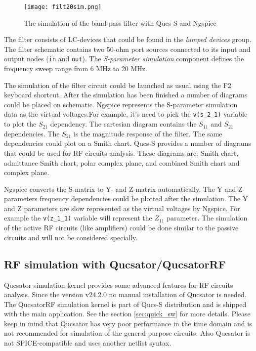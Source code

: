     \begin{figure}[!ht]
    \begin{center}
        \texttt{[image: filt20sim.png]}
    \end{center}
    \caption{The simulation of the band-pass filter with Qucs-S and Ngspice} \label{fig:filt20m}
    \end{figure}

The filter consists of LC-devices that could be found in the \emph{lumped devices} group. The filter schematic contains two 50-ohm port sources connected to its input and output nodes (\verb|in| and \verb|out|). The \emph{S-parameter simulation} component defines the frequency sweep range from 6 MHz to 20 MHz.

The simulation of the filter circuit could be launched as usual using the F2 keyboard shortcut. After the simulation has been finished a number of diagrams could be placed on schematic. Ngspice represents the S-parameter simulation data as the virtual voltages.For example, it's need to pick the \verb|v(s_2_1)| variable to plot the $S_{21}$ dependency. The cartesian diagram contains the $S_{11}$ and $S_{21}$ dependencies. The $S_{21}$ is the magnitude response of the filter. The same dependencies could plot on a Smith chart. Qucs-S provides a number of diagrams that could be used for RF circuits analysis. These diagrams are: Smith chart, admittance Smith chart, polar complex plane, and combined Smith chart and complex plane.

Ngspice converts the S-matrix to Y- and Z-matrix automatically. The Y and Z-parameters frequency dependencies could be plotted after the simulation. The Y and Z parameters are slow represented as the virtual voltages by Ngspice. For example the \verb|v(z_1_1)| variable will represent the $Z_{11}$ parameter. The simulation of the active RF circuits (like amplifiers) could be done similar to the passive circuits and will not be considered specially.

\subsection{RF simulation with Qucsator/QucsatorRF}

Qucsator simulation kernel provides some advanced features for RF circuits analysis. Since the version v24.2.0 no manual installation of Qucsator is needed. The QucsatorRF simulation kernel is part of Qucs-S distribution and is shipped with the main application. See the section \ref{sec:quick_sw} for more details. Please keep in mind that Qucsator has very poor performance in the time domain and is not recommended for simulation of the general purpose circuits. Also Qucsator is not SPICE-compatible and uses another netlist syntax.

